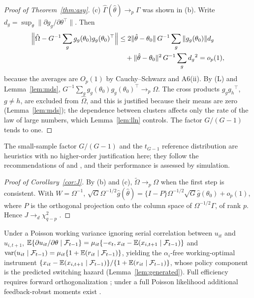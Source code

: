 \begin{proof}[Proof of Theorem~\ref{thm:asy}]
(c) $\hat\Gamma(\hat\theta)\to_p\Gamma$ was shown in (b). Write
$d_g=\sup_\theta\|\partial g_g/\partial\theta^{\top}\|$. Then
\begin{align*}
\Bigl\|\hat\Omega-G^{-1}\sum_gg_g(\theta_0)g_g(\theta_0)^{\top}\Bigr\|
&\le2\|\hat\theta-\theta_0\|\,G^{-1}\sum_g\|g_g(\theta_0)\|d_g\\
&\quad+\|\hat\theta-\theta_0\|^2\,G^{-1}\sum_gd_g{}^2=o_p(1),
\end{align*}
because the averages are $O_p(1)$ by Cauchy--Schwarz and A6(ii). By (L) and Lemma~\ref{lem:mds},
$G^{-1}\sum_gg_g(\theta_0)g_g(\theta_0)^{\top}\to_p\Omega$. The cross products $g_gg_h{}^{\top}$, $g\ne h$, are
excluded from $\hat\Omega$, and this is justified because their means are zero
(Lemma~\ref{lem:mds}); the dependence between clusters affects only the rate of the law of large
numbers, which Lemma~\ref{lem:lln} controls. The factor $G/(G-1)$ tends to one.
\end{proof}

\noindent The small-sample factor $G/(G-1)$ and the $t_{G-1}$ reference distribution are
heuristics with no higher-order justification here; they follow the recommendations of
\citet{cameron2015practitioner} and \citet{hansen2019clustered}, and their performance is
assessed by simulation.

\begin{proof}[Proof of Corollary~\ref{cor:J}]
By (b) and (c), $\tilde\Omega\to_p\Omega$ when the first step is consistent. With $W=\Omega^{-1}$,
$\sqrt G\Omega^{-1/2}\hat g(\hat\theta)=\{I-P\}\Omega^{-1/2}\sqrt G\hat g(\theta_0)+o_p(1)$, where $P$ is the
orthogonal projection onto the column space of $\Omega^{-1/2}\Gamma$, of rank $p$. Hence
$J\to_d\chi^2_{q-p}$ \citep{hansen1982gmm}.
\end{proof}

\begin{remark}
\label{rem:optimal}
Under a Poisson working variance ignoring serial correlation between $u_{it}$ and $u_{i,t+1}$,
$\mathbb{E}\{\partial u_{it}/\partial\theta\mid\mathcal{F}_{t-1}\}=\mu_{it}\{-e_t,x_{it}-\mathbb{E}(x_{i,t+1}\mid\mathcal{F}_{t-1})\}$
and $\operatorname{var}(u_{it}\mid\mathcal{F}_{t-1})=\mu_{it}\{1+\mathbb{E}(r_{it}\mid\mathcal{F}_{t-1})\}$, yielding the
$\alpha_i$-free working-optimal instrument $\{x_{it}-\mathbb{E}(x_{i,t+1}\mid\mathcal{F}_{t-1})\}/\{1+\mathbb{E}(r_{it}\mid\mathcal{F}_{t-1})\}$,
whose policy component is the predicted switching hazard (Lemma~\ref{lem:generated}). Full
efficiency requires forward orthogonalization \citep{chamberlain1992sequential,chamberlain2022feedback};
under a full Poisson likelihood additional feedback-robust moments exist \citep{bonhomme2025feedback}.
\end{remark}

